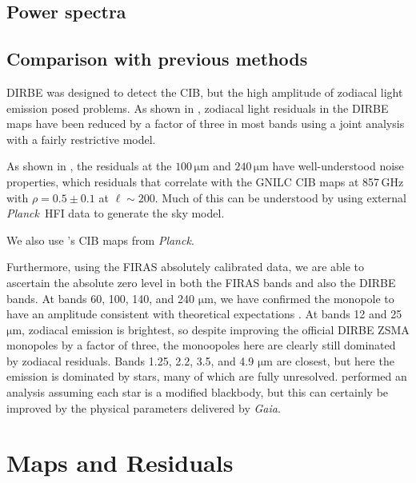 \documentclass{aa}
\def\Planck{\textit{Planck}}
\begin{document}
\subsection{Power spectra}

\subsection{Comparison with previous methods}

DIRBE was designed to detect the CIB, but the high amplitude of zodiacal light emission posed problems. As shown in \citet{CG02_02}, zodiacal light residuals in the DIRBE maps have been reduced by a factor of three in most bands using a joint analysis with a fairly restrictive model.

As shown in \citet{CG02_01}, the residuals at the $100\,\mathrm{\mu m}$ and $240\,\mathrm{\mu m}$ have well-understood noise properties, which residuals that correlate with the GNILC \citet{planck2016-XLVIII} CIB maps at 857\,GHz with $\rho=0.5\pm0.1$ at $\ell\sim200$. Much of this can be understood by using external \Planck\ HFI data to generate the sky model. 

We also use \citet{lenz2019}'s CIB maps from \Planck.

Furthermore, using the FIRAS absolutely calibrated data, we are able to ascertain the absolute zero level in both the FIRAS bands and also the DIRBE bands. At bands 60, 100, 140, and 240 $\mathrm{\mu m}$, we have confirmed the monopole to have an amplitude consistent with theoretical expectations \citep{finke2022}. At bands 12 and 25 $\mathrm{\mu m}$, zodiacal emission is brightest, so despite improving the official DIRBE ZSMA monopoles by a factor of three, the monoopoles here are clearly still dominated by zodiacal residuals. Bands 1.25, 2.2, 3.5, and 4.9 $\mathrm{\mu m}$ are closest, but here the emission is dominated by stars, many of which are fully unresolved. \citet{CG02_01} performed an analysis assuming each star is a modified blackbody, but this can certainly be improved by the physical parameters delivered by \textit{Gaia}.


\section{Maps and Residuals}

\lipsum 
\end{document}
